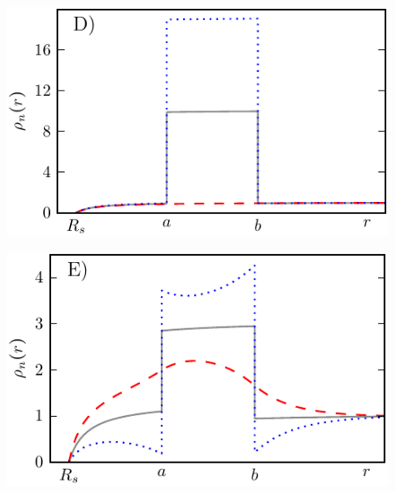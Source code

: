 \begin{minipage}[t]{0.5 \textwidth}
    \begin{figure}[H]
        \includegraphics[width = 1 \textwidth]{plots/d4.pdf}
    \end{figure}
\end{minipage}
\begin{minipage}[t]{0.5 \textwidth}
    \begin{figure}[H]
        \includegraphics[width = 1 \textwidth]{plots/d5.pdf}
    \end{figure}
\end{minipage}
